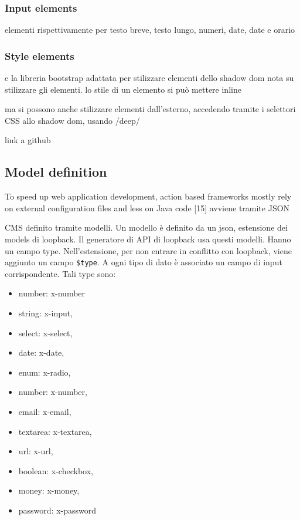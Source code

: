 \documentclass{sig-alternate}
\begin{document}
\subsubsection{Input elements}

\begin{description}
\itemsep1pt\parskip0pt
       \item[x-input, x-textarea, x-number, x-date, x-datetime] elementi rispettivamente per testo breve, testo lungo, numeri, date, date e orario
\end{description}

\subsubsection{Style elements}

\begin{description}        
\itemsep1pt\parskip0pt
       \item[x-bootstrap] e la libreria bootstrap adattata
per stilizzare elementi dello shadow dom nota su stilizzare gli elementi. lo
stile di un elemento si può mettere inline 
\end{description}

 

ma si possono anche stilizzare elementi dall'esterno, accedendo tramite i selettori CSS allo shadow dom, usando /deep/

link a github 


\subsection{Model definition}

To speed up web application development, action based frameworks mostly rely on external configuration files and less on Java code [15]
avviene tramite JSON


CMS definito tramite modelli. Un modello è definito da un json, estensione dei models di loopback. Il generatore di API di loopback usa questi modelli. Hanno un campo type. Nell'estensione, per non entrare in conflitto con loopback, viene aggiunto un campo {\tt \$type}.
A ogni tipo di dato è associato un campo di input corrispondente. 
Tali type sono: 

\begin{itemize}
\itemsep1pt\parskip0pt
       \item number: x-number
       \item string: x-input,
       \item select: x-select,
       \item date: x-date,
       \item enum: x-radio,
       \item number: x-number,
       \item email: x-email,
       \item textarea: x-textarea,
       \item url: x-url,
       \item boolean: x-checkbox,
       \item money: x-money,
       \item password: x-password
\end{itemize}
\end{document}
